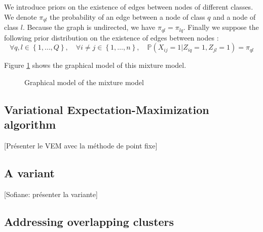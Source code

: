 \documentclass[11pt]{article}
\begin{document}
We introduce priors on the existence of edges between nodes of different classes. We denote $\pi_{ql}$ the probability of an edge between a node of class $q$ and a node of class $l$. Because the graph is undirected, we have $\pi_{ql}=\pi_{lq}$. Finally we suppose the following prior distribution on the existence of edges between nodes :
\begin{equation}
    \forall q,l\in \left\{1,\dots,Q\right\}, \quad \forall i\neq j\in \left\{1,\dots,n\right\}, \quad \mathbb{P}(X_{ij}=1|Z_{iq}=1,Z_{jl}=1)=\pi_{ql}
\end{equation}

Figure \ref{fig:graphical_model} shows the graphical model of this mixture model.

\begin{figure}[H]
    \centering
    \label{fig:graphical_model}
    \caption{Graphical model of the mixture model}
\end{figure}


\subsection{Variational Expectation-Maximization algorithm}

[Présenter le VEM avec la méthode de point fixe]


\subsection{A variant}

[Sofiane: présenter la variante]


\subsection{Addressing overlapping clusters}
\end{document}
